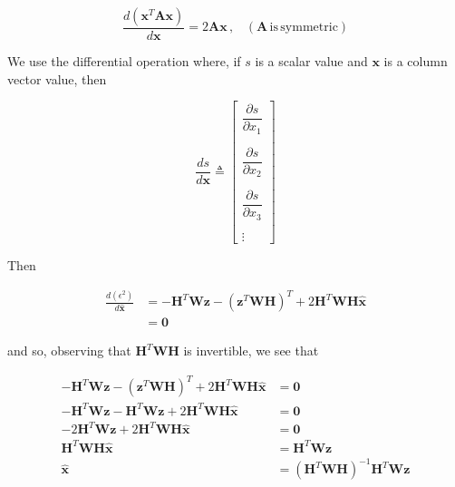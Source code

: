 \documentclass[12pt]{article}
\begin{document}
\begin{equation*}
    \frac{ d \left( \mathbf{x}^T \mathbf{A} \mathbf{x} \right) }{d \mathbf{x}} = 2 \mathbf{A} \mathbf{x} \, , \phantom{X} (\mathbf{A} \, \mathrm{is} \, \mathrm{symmetric})
\end{equation*}

We use the differential operation where, if $s$ is a scalar value and $\mathbf{x}$ is a
column vector value, then

\begin{equation*}
    \frac {d s} {d \mathbf{x}} \triangleq
    \begin{bmatrix}
    \dfrac{\partial s}{\partial x_{1}} \\
    \phantom{.} \\
    \dfrac{\partial s}{\partial x_{2}} \\
    \phantom{.} \\
    \dfrac{\partial s}{\partial x_{3}} \\
    \phantom{.} \\
    \vdots
    \end{bmatrix}
\end{equation*}

Then

\begin{equation*}
    \begin{aligned}
        \frac{ d \left( \epsilon^2 \right) }{d \hat{\mathbf{x}}}
        &= - \mathbf{H}^T \mathbf{W} \mathbf{z}
           - \left( \mathbf{z}^T \mathbf{W} \mathbf{H} \right)^T
           + 2 \mathbf{H}^T \mathbf{W} \mathbf{H} \hat{\mathbf{x}} \\
        &= \mathbf{0}
    \end{aligned}
\end{equation*}

and so, observing that $\mathbf{H}^T \mathbf{W} \mathbf{H}$ is invertible, we see that

\begin{equation*}
    \begin{aligned}
        - \mathbf{H}^T \mathbf{W} \mathbf{z}
        -  \left( \mathbf{z}^T \mathbf{W} \mathbf{H} \right)^T
        + 2 \mathbf{H}^T \mathbf{W} \mathbf{H} \hat{\mathbf{x}}
        &= \mathbf{0} \\
        - \mathbf{H}^T \mathbf{W} \mathbf{z}
        - \mathbf{H}^T \mathbf{W} \mathbf{z}
        + 2 \mathbf{H}^T \mathbf{W} \mathbf{H} \hat{\mathbf{x}}
        &= \mathbf{0} \\
        - 2 \mathbf{H}^T \mathbf{W} \mathbf{z}
        + 2 \mathbf{H}^T \mathbf{W} \mathbf{H} \hat{\mathbf{x}}
        &= \mathbf{0} \\
        \mathbf{H}^T \mathbf{W} \mathbf{H} \hat{\mathbf{x}} &= \mathbf{H}^T \mathbf{W} \mathbf{z} \\
        \hat{\mathbf{x}} &= \left( \mathbf{H}^T \mathbf{W} \mathbf{H} \right)^{-1} \mathbf{H}^T \mathbf{W} \mathbf{z} \\
    \end{aligned}
\end{equation*}
\end{document}
